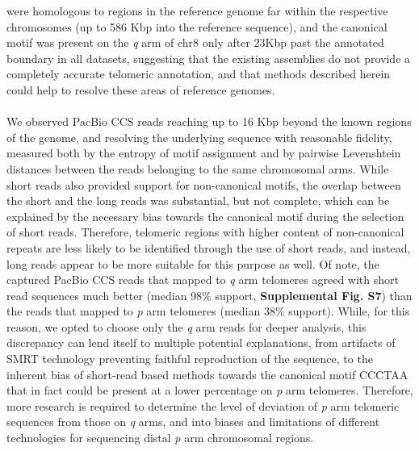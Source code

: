 \documentclass{article}
\begin{document}
        were homologous to regions in the reference genome far within the respective chromosomes (up to 586 Kbp into the reference sequence),
        and the canonical motif was present on the \textit{q} arm of chr8
            only after 2\textendash{}3Kbp past the annotated boundary in all datasets,
        suggesting that the existing assemblies do not provide a completely accurate telomeric annotation,
        and that methods described herein could help to resolve these areas of reference genomes.
    \\~\\
    We observed PacBio CCS reads reaching up to 16 Kbp beyond the known regions of the genome,
        and resolving the underlying sequence with reasonable fidelity,
        measured both by the entropy of motif assignment and by pairwise Levenshtein distances
            between the reads belonging to the same chromosomal arms.
    While short reads also provided support for non-canonical motifs,
        the overlap between the short and the long reads was substantial, but not complete,
        which can be explained by the necessary bias towards the canonical motif during the selection of short reads.
    Therefore, telomeric regions with higher content of non-canonical repeats are less likely to be identified through the use of short reads,
        and instead, long reads appear to be more suitable for this purpose as well.
    Of note, the captured PacBio CCS reads that mapped to \textit{q} arm telomeres
        agreed with short read sequences much better (median 98\% support, \textbf{Supplemental Fig. S7})
        than the reads that mapped to \textit{p} arm telomeres (median 38\% support).
        While, for this reason, we opted to choose only the \textit{q} arm reads for deeper analysis,
            this discrepancy can lend itself to multiple potential explanations,
                from artifacts of SMRT technology preventing faithful reproduction of the sequence,
                to the inherent bias of short-read based methods \cite{telomerecat} towards the canonical motif CCCTAA
                    that in fact could be present at a lower percentage on \textit{p} arm telomeres.
            Therefore, more research is required to determine the level of deviation of \textit{p} arm telomeric sequences
                from those on \textit{q} arms, and into biases and limitations of different technologies
                    for sequencing distal \textit{p} arm chromosomal regions.
    \\~\\
\end{document}
